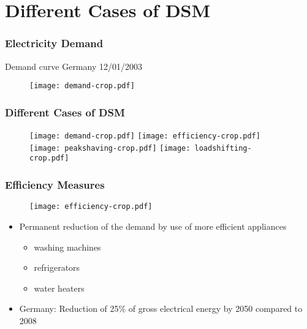 \documentclass[10pt,aspectratio=169,dvipsnames]{beamer}
\let\olditem\item
\renewcommand{\item}{%
\olditem\vspace{5pt}}
\begin{document}
\section{Different Cases of DSM}
\begin{frame}
 \frametitle{Electricity Demand}

 Demand curve Germany 12/01/2003
   \begin{figure}
     \texttt{[image: demand-crop.pdf]}
  \end{figure}

\end{frame}
\begin{frame}
 \frametitle{Different Cases of DSM}
   \begin{figure}
     \texttt{[image: demand-crop.pdf]} \texttt{[image: efficiency-crop.pdf]}\\
      \texttt{[image: peakshaving-crop.pdf]} \texttt{[image: loadshifting-crop.pdf]}
  \end{figure}

\end{frame}
\begin{frame}
 \frametitle{Efficiency Measures}
 \begin{minipage}[t]{0.5\textwidth}
    \begin{figure}
  \texttt{[image: efficiency-crop.pdf]}
  \end{figure}
\end{minipage}\hfill
\begin{minipage}[t]{0.5\textwidth}
\begin{itemize}
 \item Permanent reduction of the demand by use of more efficient appliances
 \begin{itemize}
 \item washing machines
 \item refrigerators
 \item water heaters
 \end{itemize}
 \item Germany: Reduction of 25\% of gross electrical energy by 2050 compared to 2008
\end{itemize}

\end{minipage}


\end{frame}
\end{document}
